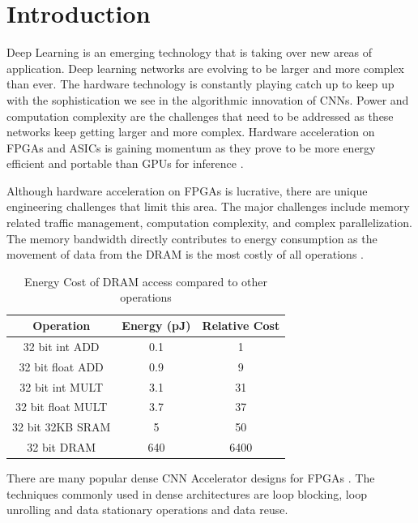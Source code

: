 \documentclass[conference]{IEEEtran}
\begin{document}
\section{Introduction}
Deep Learning is an emerging technology that is taking over new areas of application. Deep learning networks are evolving to be larger and more complex than ever\cite{he2016deep, szegedy2015going}. The hardware technology is constantly playing catch up to keep up with the sophistication we see in the algorithmic innovation of CNNs. Power and computation complexity are the challenges that need to be addressed as these networks keep getting larger and more complex. 
Hardware acceleration on FPGAs\cite{Lacey2016} and ASICs is gaining momentum as they prove to be more energy efficient and portable than GPUs for inference\cite{Fowers:2012:PEC:2145694.2145704} \cite{sze2017efficient}.  

Although hardware acceleration on FPGAs is lucrative, there are unique engineering challenges that limit this area. The major challenges include memory related traffic management, computation complexity, and complex parallelization. The memory bandwidth directly contributes to energy consumption as the movement of data from the DRAM is the most costly of all operations \cite{han2016eie}.

\begin{table}[!ht]
\centering
\caption{Energy Cost of DRAM access compared to other operations\cite{han2016eie}}
\label{energy}
\begin{tabular}{ccc}
\hline
\textbf{Operation} & \textbf{Energy (pJ)} & \textbf{Relative Cost} \\ \hline
32 bit int ADD     & 0.1                  & 1                      \\
32 bit float ADD   & 0.9                  & 9                      \\
32 bit int MULT    & 3.1                  & 31                     \\
32 bit float MULT  & 3.7                  & 37                     \\
32 bit 32KB SRAM   & 5                    & 50                     \\
32 bit DRAM        & 640                  & 6400                   \\ \hline
\end{tabular}
\end{table}

 \color{black}
There are many popular dense CNN Accelerator designs for FPGAs \cite{chakradhar2010dynamically,zhang2015optimizing,Eyeriss}.
The techniques commonly used in dense architectures are loop blocking, loop unrolling and data stationary operations and data reuse. 
\end{document}
